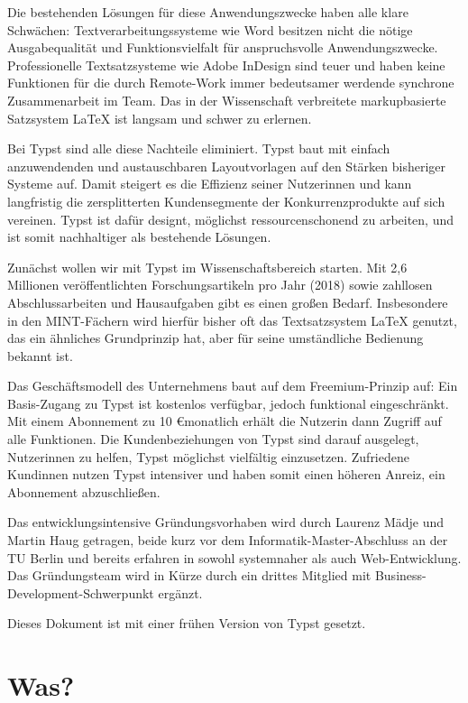 \documentclass[11pt, a4paper]{article}
\newcommand{\gender}{\raisebox{-.25em}{*}}
\let\oldsection\section
\renewcommand\section{\clearpage\oldsection}
\renewcommand{\glossary} {\marginsymbol{$\hookrightarrow$}}
\newcommand{\cited}[1]{\marginsymbol{$\nearrow$ #1}}
\newcommand{\marginsymbol}[1] {\protect\marginsymbolhelper{#1}}
\newcommand{\marginsymbolhelper}[1] {\tabto*{-1cm}\makebox[0cm]{#1}\tabto*{\TabPrevPos}}
\begin{document}
Die bestehenden Lösungen für diese Anwendungszwecke haben alle klare Schwächen: Textverarbeitungssysteme wie Word besitzen nicht die nötige Ausgabequalität und Funktionsvielfalt für anspruchsvolle Anwendungszwecke. Professionelle Textsatzsysteme wie Adobe InDesign sind teuer und haben keine Funktionen für die durch Remote-Work immer bedeutsamer werdende synchrone Zusammenarbeit im Team. Das in der Wissenschaft verbreitete \glossary markupbasierte Satzsystem LaTeX ist langsam und schwer zu erlernen.

Bei Typst sind alle diese Nachteile eliminiert. Typst baut mit einfach anzuwendenden und austauschbaren Layoutvorlagen auf den Stärken bisheriger Systeme auf. Damit steigert es die Effizienz seiner Nutzer\gender{}innen und kann langfristig die zersplitterten Kundensegmente der Konkurrenzprodukte auf sich vereinen. Typst ist dafür designt, möglichst ressourcenschonend zu arbeiten, und ist somit nachhaltiger als bestehende Lösungen.

Zunächst wollen wir mit Typst im Wissenschaftsbereich starten. Mit \cited{1} 2,6 Millionen veröffentlichten Forschungsartikeln pro Jahr (2018) sowie zahllosen Abschlussarbeiten und Hausaufgaben gibt es einen großen Bedarf. Insbesondere in den MINT-Fächern wird hierfür bisher oft das Textsatzsystem LaTeX genutzt, das ein ähnliches Grundprinzip hat, aber für seine umständliche Bedienung bekannt ist.

Das Geschäftsmodell des Unternehmens baut auf dem Freemium-Prinzip auf: Ein Basis-Zugang zu Typst ist kostenlos verfügbar, jedoch funktional eingeschränkt. Mit einem Abonnement zu 10 \euro monatlich erhält die\gender{} Nutzer\gender{}in dann Zugriff auf alle Funktionen. Die Kundenbeziehungen von Typst sind darauf ausgelegt, Nutzer\gender{}innen zu helfen, Typst möglichst vielfältig einzusetzen. Zufriedene Kund\gender{}innen nutzen Typst intensiver und haben somit einen höheren Anreiz, ein Abonnement abzuschließen.

Das entwicklungsintensive Gründungsvorhaben wird durch Laurenz Mädje und Martin Haug getragen, beide kurz vor dem Informatik-Master-Abschluss an der TU Berlin und bereits erfahren in sowohl systemnaher als auch Web-Entwicklung. Das Gründungsteam wird in Kürze durch ein drittes Mitglied mit Business-Development-Schwerpunkt ergänzt.

Dieses Dokument ist mit einer frühen Version von Typst gesetzt.


\section*{Was?}
\end{document}
